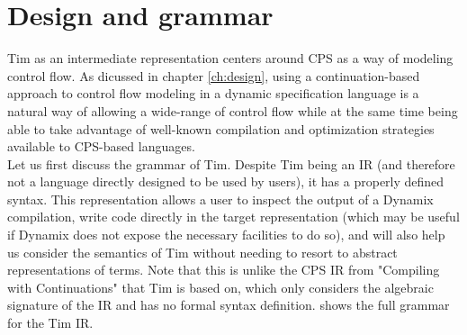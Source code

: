 \section{Design and grammar}
\label{sec:tim_grammar}
Tim as an intermediate representation centers around \acf{CPS} as a way of modeling control flow. As dicussed in chapter \ref{ch:design}, using a continuation-based approach to control flow modeling in a dynamic specification language is a natural way of allowing a wide-range of control flow while at the same time being able to take advantage of well-known compilation and optimization strategies available to \ac{CPS}-based languages.\\

Let us first discuss the grammar of Tim. Despite Tim being an \ac{IR} (and therefore not a language directly designed to be used by users), it has a properly defined syntax. This representation allows a user to inspect the output of a Dynamix compilation, write code directly in the target representation (which may be useful if Dynamix does not expose the necessary facilities to do so), and will also help us consider the semantics of Tim without needing to resort to abstract representations of terms. Note that this is unlike the \ac{CPS} \ac{IR} from "Compiling with Continuations" \cite{Appel1992} that Tim is based on, which only considers the algebraic signature of the IR and has no formal syntax definition.  shows the full grammar for the Tim \ac{IR}.\\

